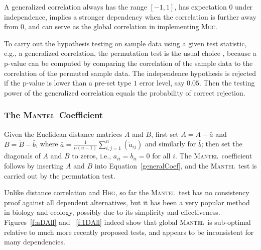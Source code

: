 \documentclass[11pt]{article}
\providecommand{\sct}[1]{{\normalfont\textsc{#1}}}
\newcommand{\Mgc}{\sct{Mgc}}
\newcommand{\Hhg}{\sct{Hhg}}
\newcommand{\Mantel}{\sct{Mantel}}
\begin{document}
A generalized correlation always has the range $[-1,1]$, has expectation $0$ under independence, implies a stronger dependency when the correlation is further away from $0$, and can serve as the global correlation in implementing \Mgc. 

To carry out the hypothesis testing on sample data using a given test statistic, e.g., a generalized correlation, the permutation test is the usual choice \cite{GoodPermutationBook}, because a p-value can be computed by comparing the correlation of the sample data to the correlation of the permuted sample data. The independence hypothesis is rejected if the p-value is lower than a pre-set type $1$ error level, say $0.05$. Then the testing power of the generalized correlation equals the probability of correct rejection.

\subsubsection{The \Mantel~Coefficient}
\label{appen:mantel}
Given the Euclidean distance matrices $\tilde{A}$ and $\tilde{B}$, first set $A=\tilde{A}-\bar{a}$ and $B=\tilde{B}-\bar{b}$, where $\bar{a}=\frac{1}{n(n-1)}\sum_{i,j=1}^{n}(\tilde{a}_{ij})$ and similarly for $\bar{b}$; then set the diagonals of $A$ and $B$ to zeros, i.e., $a_{ii}=b_{ii}=0$ for all $i$.
The \Mantel~coefficient \cite{Mantel1967} follows by inserting $A$ and $B$ into Equation~\ref{generalCoef},
and the \Mantel~test is carried out by the permutation test.


Unlike distance correlation and \Hhg, so far the \Mantel~test has no consistency proof against all dependent alternatives, 
but it has been a very popular method in biology and ecology, possibly due to its simplicity and effectiveness. Figures~\ref{f:nDAll} and ~\ref{f:1DAll} indeed show that global \Mantel~is sub-optimal relative to much more recently proposed tests, and appears to be inconsistent for many dependencies. 
\end{document}
